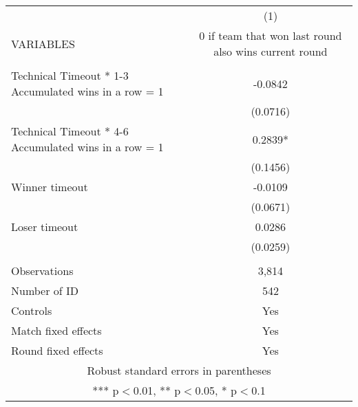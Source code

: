\documentclass[]{article}
\begin{document}
\begin{tabular}{lc} \hline
 & (1) \\
VARIABLES & 0 if team that won last round also wins current round \\ \hline
 &  \\
Technical Timeout * 1-3 Accumulated wins in a row = 1 & -0.0842 \\
 & (0.0716) \\
Technical Timeout * 4-6 Accumulated wins in a row = 1 & 0.2839* \\
 & (0.1456) \\
Winner timeout & -0.0109 \\
 & (0.0671) \\
Loser timeout & 0.0286 \\
 & (0.0259) \\
 &  \\
Observations & 3,814 \\
Number of ID & 542 \\
Controls & Yes \\
Match fixed effects & Yes \\
 Round fixed effects & Yes \\ \hline
\multicolumn{2}{c}{ Robust standard errors in parentheses} \\
\multicolumn{2}{c}{ *** p$<$0.01, ** p$<$0.05, * p$<$0.1} \\
\end{tabular}
\end{document}
